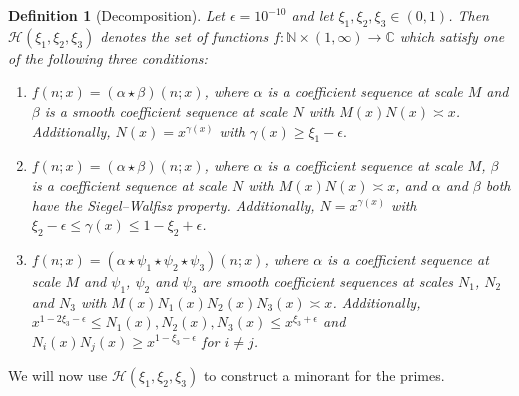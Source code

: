 \documentclass{amsart}
\newtheorem{defn}{Definition}
\numberwithin{equation}{section}
\begin{document}
\begin{defn}[Decomposition] \label{def:decharman}
Let $\epsilon = 10^{-10}$ and let $\xi_1, \xi_2, \xi_3 \in (0,1)$. Then $\mathcal{H}(\xi_1,\xi_2,\xi_3)$ denotes the set of functions $f: \mathbb{N} \times (1,\infty) \rightarrow \mathbb{C}$ which satisfy   one of the following three conditions: 
\begin{enumerate} 
\item[{\rm (I)}]  $f(n;x) = (\alpha \star \beta)(n;x)$, where $\alpha$ is  a coefficient sequence at scale $M$ and $\beta$ is a  smooth  coefficient sequence at scale $N$ with $M(x) N(x) \asymp x$. Additionally, $N(x) = x^{\gamma(x)}$ with $
\gamma(x) \geq  \xi_1-\epsilon.
$
\item[{\rm (II)}]  $f(n;x) = (\alpha \star \beta)(n;x)$, where $\alpha$ is a coefficient sequence at scale $M$, $\beta$ is a  coefficient sequence at scale $N$ with $M(x) N(x) \asymp x$, and $\alpha$ and $\beta$ both have the Siegel--Walfisz property.   Additionally, $N = x^{\gamma(x)}$ with 
$\xi_2 -\epsilon \leq \gamma(x) \leq 1- \xi_2+\epsilon$. 
\item[{\rm (III)}] $f(n;x) = (\alpha \star \psi_1 \star \psi_2 \star \psi_3)(n;x)$, where $\alpha$ is a coefficient sequence at scale $M$ and $\psi_1$, $\psi_2$ and $\psi_3$ are   smooth  coefficient sequences at scales $N_1$, $N_2$ and $N_3$ with $M(x) N_1(x) N_2(x) N_3(x) \asymp x$.   Additionally, $x^{1-2\xi_3-\epsilon} \leq N_1(x), N_2(x), N_3(x) \leq x^{\xi_3+\epsilon}$ and $N_i(x)N_j(x) \geq x^{1-\xi_3-\epsilon}$ for $i \neq j$.
\end{enumerate} 
\end{defn}
We will now use    $\mathcal{H}(\xi_1,\xi_2,\xi_3)$   to construct a minorant for the primes.  
\end{document}
